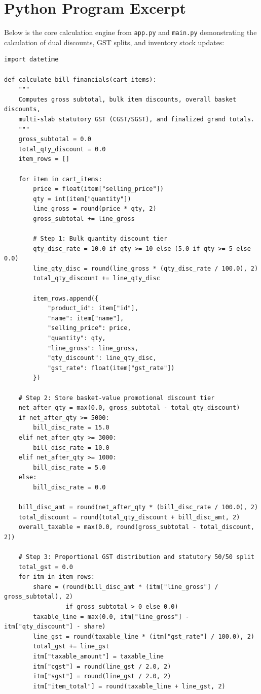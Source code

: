 \documentclass[12pt,a4paper]{article}
\begin{document}
\section{Python Program Excerpt}
Below is the core calculation engine from \texttt{app.py} and \texttt{main.py} demonstrating the calculation of dual discounts, GST splits, and inventory stock updates:

\begin{lstlisting}[caption={Core Financials Calculation and Stock Decrement Engine}]
import datetime

def calculate_bill_financials(cart_items):
    """
    Computes gross subtotal, bulk item discounts, overall basket discounts,
    multi-slab statutory GST (CGST/SGST), and finalized grand totals.
    """
    gross_subtotal = 0.0
    total_qty_discount = 0.0
    item_rows = []

    for item in cart_items:
        price = float(item["selling_price"])
        qty = int(item["quantity"])
        line_gross = round(price * qty, 2)
        gross_subtotal += line_gross

        # Step 1: Bulk quantity discount tier
        qty_disc_rate = 10.0 if qty >= 10 else (5.0 if qty >= 5 else 0.0)
        line_qty_disc = round(line_gross * (qty_disc_rate / 100.0), 2)
        total_qty_discount += line_qty_disc

        item_rows.append({
            "product_id": item["id"],
            "name": item["name"],
            "selling_price": price,
            "quantity": qty,
            "line_gross": line_gross,
            "qty_discount": line_qty_disc,
            "gst_rate": float(item["gst_rate"])
        })

    # Step 2: Store basket-value promotional discount tier
    net_after_qty = max(0.0, gross_subtotal - total_qty_discount)
    if net_after_qty >= 5000:
        bill_disc_rate = 15.0
    elif net_after_qty >= 3000:
        bill_disc_rate = 10.0
    elif net_after_qty >= 1000:
        bill_disc_rate = 5.0
    else:
        bill_disc_rate = 0.0

    bill_disc_amt = round(net_after_qty * (bill_disc_rate / 100.0), 2)
    total_discount = round(total_qty_discount + bill_disc_amt, 2)
    overall_taxable = max(0.0, round(gross_subtotal - total_discount, 2))

    # Step 3: Proportional GST distribution and statutory 50/50 split
    total_gst = 0.0
    for itm in item_rows:
        share = (round(bill_disc_amt * (itm["line_gross"] / gross_subtotal), 2)
                 if gross_subtotal > 0 else 0.0)
        taxable_line = max(0.0, itm["line_gross"] - itm["qty_discount"] - share)
        line_gst = round(taxable_line * (itm["gst_rate"] / 100.0), 2)
        total_gst += line_gst
        itm["taxable_amount"] = taxable_line
        itm["cgst"] = round(line_gst / 2.0, 2)
        itm["sgst"] = round(line_gst / 2.0, 2)
        itm["item_total"] = round(taxable_line + line_gst, 2)


\end{lstlisting}
\end{document}
